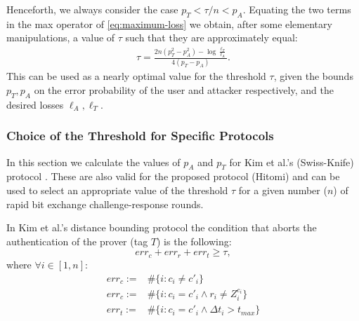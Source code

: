 \documentclass{article}
\newcommand \thr {\tau}
\newcommand \pa {p_A}
\newcommand \pt {p_T}
\newcommand \LA {\ell_A}
\newcommand \LT {\ell_T}
\newcommand \AND {\wedge}
\begin{document}
Henceforth, we always consider the case $\pt < \thr / n < \pa$.
Equating the two terms in the max operator of \eqref{eq:maximum-loss}
we obtain, after some elementary manipulations, a value of $\thr$ such
that they are approximately equal:
\begin{align}
\iffalse
  \exp\left(-\frac{2}{n}(n\pt - \thr)^2\right) \LT
  =
  \exp\left(-\frac{2}{n}(n\pa - \thr)^2\right) \LA
  \\
  -\frac{2}{n}(n\pt - \thr)^2 + \log \LT
  =
  -\frac{2}{n}(n\pa - \thr)^2 + \log \LA
  \\
  (n\pt - \thr)^2 - \frac{n}{2}\log \LT
  =
  (n\pa - \thr)^2 - \frac{n}{2}\log \LA
  \\
  (n\pt - \thr)^2
  -
  (n\pa - \thr)^2
  = \frac{n}{2}\log \frac{\LT}{\LA}
  \\
  n^2(\pt -\pa)
  (\pa + \pt - 2\thr/n)
  = \frac{n}{2}\log \frac{\LT}{\LA}
  \\
  (\pa + \pt - 2\thr/n)
  = \frac{1}{2  n(\pt -\pa)
  }\log \frac{\LT}{\LA}
  \\
  \thr
  = \frac{n}{2}(\pa + \pt)
  - \frac{1}{4(\pt -\pa)}
  \log \frac{\LT}{\LA}
  \\
\fi
  \thr
  =
  \frac{2n(\pt^2-\pa^2) - \log \frac{\LT}{\LA}}{4(\pt -\pa)}.
  \label{eq:threshold}
\end{align}
This can be used as a nearly optimal value for the threshold $\tau$, given
the bounds $\pt, \pa$ on the error probability of the user and attacker
respectively, and the desired losses $\LA, \LT$.

\subsubsection{Choice of the Threshold for Specific Protocols}

In this section we  calculate the values of $\pa$ and $\pt$ for Kim et al.'s (Swiss-Knife) protocol \cite{KimAKSP-2008-icisc}. These are also valid for the proposed protocol (Hitomi) and can be used to select an appropriate value of the threshold $\thr$ for a given number ($n$) of rapid bit exchange challenge-response rounds.

In Kim et al.'s distance bounding protocol the condition that aborts  the authentication of the prover (tag $T$) is the following:
\begin{equation}
err_{c}+err_{r}+err_{t} \geq \thr, \nonumber
\end{equation}
where $\forall i \in [1,n]$:
\begin{align}
err_{c}:=& \#\{i : c_{i}\neq c'_{i}\} \\
err_{c}:=& \#\{i : c_{i}= c'_{i} \AND  r_{i} \neq Z_{i}^{{c_{i}}} \}\\
err_{t} :=& \# \{i: c_{i}=c'_{i}   \AND \Delta t_{i} >t_{max}\}
\end{align}
\end{document}
